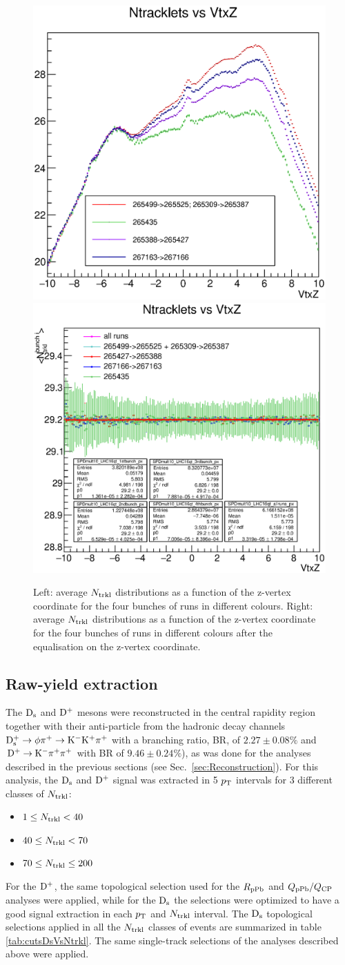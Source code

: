 \begin{figure}[h]
\centering
 \includegraphics[width=.45\textwidth]{FigCap6/NtrkVsZVtx_FinalWeights.eps}
 \includegraphics[width=.465\textwidth]{FigCap6/NtrkProfilesDataAfterZVxtEqual.eps}
 \caption{Left: average $N_{\rm trkl}$ distributions as a function of the z-vertex coordinate for the four bunches of runs in different colours. Right: average $N_{\rm trkl}$ distributions as a function of the z-vertex coordinate for the four bunches of runs in different colours after the equalisation on the z-vertex coordinate.}
 \label{fig:FourBunches}
\end{figure}

\subsection {Raw-yield extraction}
\label{sec:Rawyields_vs_mult}
The ${\rm D_s}$ and ${\rm D^+}$ mesons were reconstructed in the central rapidity region together with their anti-particle from the hadronic decay channels
${\rm D_s^{+}\to \phi\pi^+\to K^-K^+\pi^+}$  with a branching ratio, BR, of $2.27 \pm0.08\%$ and ${\rm D}^+\to {\rm K}^-\pi^+\pi^+$ with BR of $9.46\pm0.24 \%$), as was done for the analyses described in the previous sections (see Sec.~\ref{sec:Reconstruction}). For this analysis, the ${\rm D_s}$ and ${\rm D^+}$ signal was extracted in 5 $p_{\rm T}$ intervals for 3 different classes of $N_{\rm trkl}$:
\begin{itemize}
\item $1 \leq N_{\rm trkl} < 40$
\item $40 \leq N_{\rm trkl} < 70$
\item $70 \leq N_{\rm trkl} \leq 200$
\end{itemize}
For the ${\rm D^+}$, the same topological selection used for the $R_{\rm pPb}$ and $Q_{\rm pPb}/Q_{\rm CP}$ analyses were applied, while for the ${\rm D_s}$ the selections were optimized to have a good signal extraction in each $p_{\rm T}$ and $N_{\rm trkl}$ interval. The ${\rm D_s}$ topological selections applied in all the $N_{\rm trkl}$ classes of events are summarized in table \ref{tab:cutsDsVsNtrkl}. The same single-track selections of the analyses described above were applied.

